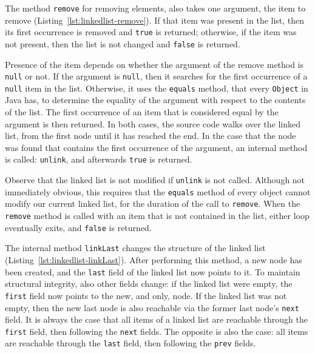 \documentclass[runningheads]{llncs}
\begin{document}
The method \texttt{remove} for removing elements, also takes one argument, the item to remove (Listing~\ref{lst:linkedlist-remove}). If that item was present in the list, then its first occurrence is removed and \texttt{true} is returned; otherwise, if the item was not present, then the list is not changed and \texttt{false} is returned.

Presence of the item depends on whether the argument of the remove method is \texttt{null} or not. If the argument is \texttt{null}, then it searches for the first occurrence of a \texttt{null} item in the list. Otherwise, it uses the \texttt{equals} method, that every \texttt{Object} in Java has, to determine the equality of the argument with respect to the contents of the list. The first occurrence of an item that is considered equal by the argument is then returned. In both cases, the source code walks over the linked list, from the first node until it has reached the end. In the case that the node was found that contains the first occurrence of the argument, an internal method is called: \texttt{unlink}, and afterwards \texttt{true} is returned.

Observe that the linked list is not modified if \texttt{unlink} is not called. Although not immediately obvious, this requires that the \texttt{equals} method of every object cannot modify our current linked list, for the duration of the call to \texttt{remove}. When the \texttt{remove} method is called with an item that is not contained in the list, either loop eventually exits, and \texttt{false} is returned.



The internal method \texttt{linkLast} changes the structure of the linked list (Listing~\ref{lst:linkedlist-linkLast}). After performing this method, a new node has been created, and the \texttt{last} field of the linked list now points to it. To maintain structural integrity, also other fields change: if the linked list were empty, the \texttt{first} field now points to the new, and only, node. If the linked list was not empty, then the new last node is also reachable via the former last node's \texttt{next} field. It is always the case that all items of a linked list are reachable through the \texttt{first} field, then following the \texttt{next} fields. The opposite is also the case: all items are reachable through the \texttt{last} field, then following the \texttt{prev} fields.
\end{document}
